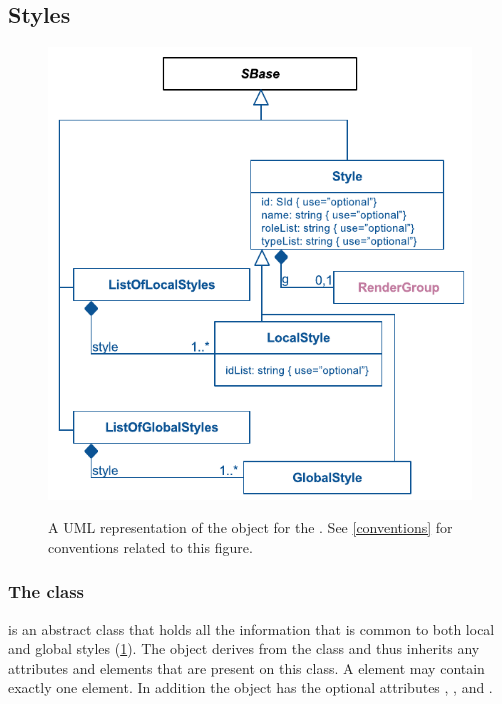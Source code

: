 \subsection{Styles}


\begin{figure}[h!]
  \centering
  \includegraphics{images/render-style-uml}\\
  \caption{A UML representation of the \Style object for the \RenderPackage.
	See \ref{conventions} for conventions related to this figure. }
  \label{fig:style_render_uml}
\end{figure}
\subsubsection{The  class}
\label{style-class}

\Style is an abstract class that holds all the information that is common to both local and global styles (\ref{fig:style_render_uml}). The \Style object derives from the \SBase class and thus inherits any
attributes and elements that are present on this class.
A \Style element may contain exactly one \RenderGroup element.
In addition the \Style object has the optional attributes , ,  and .


